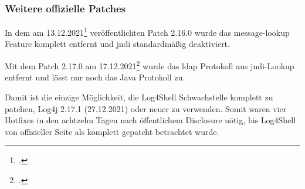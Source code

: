 \subsubsection{Weitere offizielle Patches}
In dem am 13.12.2021\footcite{log4jChange} veröffentlichten Patch 2.16.0 wurde das message-lookup Feature komplett entfernt und \gls{jndi} standardmäßig deaktiviert.

Mit dem Patch 2.17.0 am 17.12.2021\footcite{log4jChange} wurde das \gls{ldap} Protokoll aus \gls{jndi}-Lookup entfernt und lässt nur noch das Java Protokoll zu.

Damit ist die einzige Möglichkeit, die Log4Shell Schwachstelle komplett zu patchen, Log4j 2.17.1 (27.12.2021) oder neuer zu verwenden.
Somit waren vier Hotfixes in den achtzehn Tagen nach öffentlichem Disclosure nötig, bis Log4Shell von offizieller Seite als komplett gepatcht betrachtet wurde.
